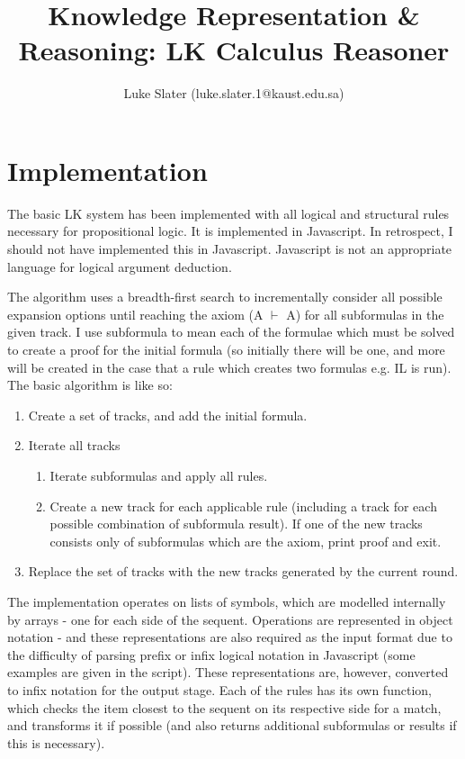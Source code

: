 \documentclass{article}
\begin{document}
\setlength{\parskip}{\medskipamount}
\setlength{\parindent}{0pt}

\title{Knowledge Representation \& Reasoning: LK Calculus Reasoner}
\author{Luke Slater (luke.slater.1@kaust.edu.sa)}

\maketitle

\pagebreak

\section{Implementation}

The basic LK system has been implemented with all logical and structural rules
necessary for propositional logic. It is implemented in
Javascript. In retrospect, I should not have implemented this in Javascript. Javascript is not an appropriate language for logical argument
deduction.

The algorithm uses a breadth-first search to incrementally consider all possible
expansion options until reaching the axiom (A $\vdash$ A) for all subformulas in
the given track. I use subformula to mean each of the formulae which must be
solved to create a proof for the initial formula (so initially there will be
one, and more will be created in the case that a rule which creates two formulas
e.g. IL is run). The basic algorithm is like so:

\begin{enumerate}
  \item Create a set of tracks, and add the initial formula.
  \item Iterate all tracks
    \begin{enumerate}
      \item Iterate subformulas and apply all rules.
      \item Create a new track for each applicable rule (including a track for each 
      possible combination of subformula result). If one of the new tracks
      consists only of subformulas which are the axiom, print proof and exit.
    \end{enumerate}
  \item Replace the set of tracks with the new tracks generated by the current
  round.
\end{enumerate}

The implementation operates on lists of symbols, which are modelled internally
by arrays - one for each side of the sequent. Operations are represented in
object notation - and these representations are also required as the input
format due to the difficulty of parsing prefix or infix logical notation in
Javascript (some examples are given in the script). These representations are, 
however, converted to infix notation for
the output stage. Each of the rules has its own function, which checks the item
closest to the sequent on its respective side for a match, and transforms it if
possible (and also returns additional subformulas or results if this is
necessary).
\end{document}
